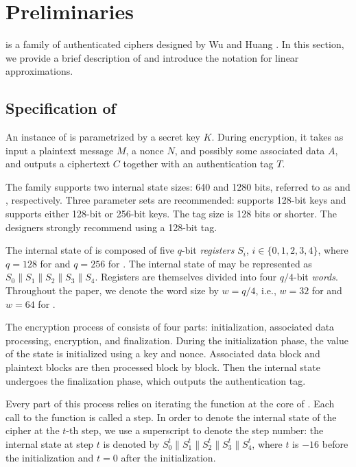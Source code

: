 
\section{Preliminaries}
\label{sec/Preliminaries}

\MORUS is a family of authenticated ciphers designed by Wu and Huang \cite{MORUS}.
In this section, we provide a brief description of \MORUS and introduce the
notation for linear approximations.

\subsection{Specification of \MORUS}
\label{subsec/Spec}

An instance of \MORUS is parametrized by a secret key $K$. During encryption, it takes as input a plaintext message $M$, a nonce $N$, and possibly some associated data $A$, and outputs a ciphertext $C$ together with an authentication tag $T$.

The \MORUS family supports two internal state sizes: 640 and 1280 bits,
referred to as \MORUS[640] and \MORUS[1280], respectively.
Three parameter sets are recommended: \MORUS[640] supports 128-bit keys and \MORUS[1280] supports either 128-bit or 256-bit keys. The tag size is 128 bits or shorter. The designers strongly recommend using a 128-bit tag.

The internal state of \MORUS is composed of five $q$-bit \emph{registers} $S_i$, $i \in\{0,1,2,3,4\}$, where $q = 128$ for \MORUS[640] and $q=256$ for \MORUS[1280]. The internal state of \MORUS may be represented as $S_0\|S_1\|S_2\|S_3\|S_4$.
Registers are themselves divided into four $q/4$-bit \emph{words}.
Throughout the paper, we denote the word size by $w = q/4$, i.e., $w=32$ for \MORUS[640] and $w=64$ for \MORUS[1280].

The encryption process of \MORUS consists of four parts: initialization, associated data processing, encryption, and finalization. 
During the initialization phase, the value of the state is initialized using a key and nonce.
Associated data block and plaintext blocks are then processed block by block.
Then the internal state undergoes the finalization phase, which outputs the authentication tag.

Every part of this process relies on iterating the \StateUpdate{} function at the core of \MORUS. Each call to the \StateUpdate{} function is called a step.
In order to denote the internal state of the cipher at the $t$-th step, we use a superscript to denote the step number: the internal state at step $t$ is denoted by $S^t_0\|S^t_1\|S^t_2\|S^t_3\|S^t_4$, where $t$ is $-16$ before the initialization and $t=0$ after the initialization.

